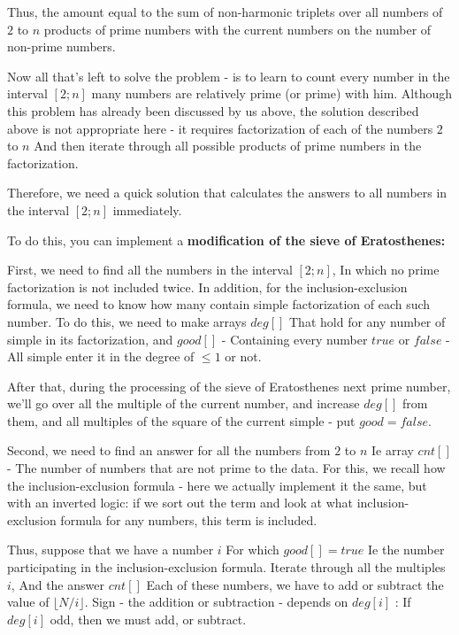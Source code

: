 Thus, the amount equal to the sum of non-harmonic triplets over all numbers of $2$ to $n$ products of prime numbers with the current numbers on the number of non-prime numbers.

Now all that's left to solve the problem - is to learn to count every number in the interval $[2; n]$ many numbers are relatively prime (or prime) with him. Although this problem has already been discussed by us above, the solution described above is not appropriate here - it requires factorization of each of the numbers $2$ to $n$ And then iterate through all possible products of prime numbers in the factorization.

Therefore, we need a quick solution that calculates the answers to all numbers in the interval $[2; n]$ immediately.

To do this, you can implement a \textbf{modification of the sieve of Eratosthenes:}

First, we need to find all the numbers in the interval $[2; n]$, In which no prime factorization is not included twice. In addition, for the inclusion-exclusion formula, we need to know how many contain simple factorization of each such number.
To do this, we need to make arrays $deg []$ That hold for any number of simple in its factorization, and $good []$ - Containing every number $true$ or $false$ - All simple enter it in the degree of $\le 1$ or not.

After that, during the processing of the sieve of Eratosthenes next prime number, we'll go over all the multiple of the current number, and increase $deg []$ from them, and all multiples of the square of the current simple - put $good = false$.

Second, we need to find an answer for all the numbers from $2$ to $n$ Ie array $cnt []$ - The number of numbers that are not prime to the data.
For this, we recall how the inclusion-exclusion formula - here we actually implement it the same, but with an inverted logic: if we sort out the term and look at what inclusion-exclusion formula for any numbers, this term is included.

Thus, suppose that we have a number $i$ For which $good [] = true$ Ie the number participating in the inclusion-exclusion formula. Iterate through all the multiples $i$, And the answer $cnt []$ Each of these numbers, we have to add or subtract the value of $\lfloor N / i \rfloor$. Sign - the addition or subtraction - depends on $deg [i]$ : If $deg [i]$ odd, then we must add, or subtract.

